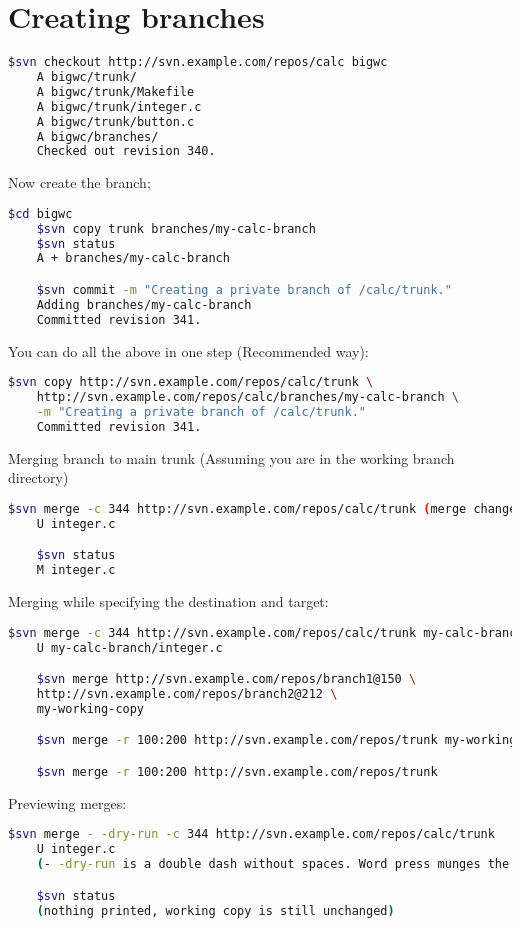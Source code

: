 \documentclass{article}
\begin{document}
\section{Creating branches}
\begin{lstlisting}[language=BASH]
    $svn checkout http://svn.example.com/repos/calc bigwc
    A bigwc/trunk/
    A bigwc/trunk/Makefile
    A bigwc/trunk/integer.c
    A bigwc/trunk/button.c
    A bigwc/branches/
    Checked out revision 340. 
\end{lstlisting}
Now create the branch;
\begin{lstlisting}[language=BASH]
    $cd bigwc
    $svn copy trunk branches/my-calc-branch
    $svn status
    A + branches/my-calc-branch

    $svn commit -m "Creating a private branch of /calc/trunk."
    Adding branches/my-calc-branch
    Committed revision 341. 
\end{lstlisting}
You can do all the above in one step (Recommended way):
\begin{lstlisting}[language=BASH]
    $svn copy http://svn.example.com/repos/calc/trunk \
    http://svn.example.com/repos/calc/branches/my-calc-branch \
    -m "Creating a private branch of /calc/trunk."
    Committed revision 341.
\end{lstlisting}
Merging branch to main trunk (Assuming you are in the working branch directory)
\begin{lstlisting}[language=BASH]
    $svn merge -c 344 http://svn.example.com/repos/calc/trunk (merge change revision number 344 on your working directory branch)
    U integer.c

    $svn status
    M integer.c 
\end{lstlisting}
Merging while specifying the destination and target:
\begin{lstlisting}[language=BASH]
    $svn merge -c 344 http://svn.example.com/repos/calc/trunk my-calc-branch
    U my-calc-branch/integer.c

    $svn merge http://svn.example.com/repos/branch1@150 \
    http://svn.example.com/repos/branch2@212 \
    my-working-copy

    $svn merge -r 100:200 http://svn.example.com/repos/trunk my-working-copy

    $svn merge -r 100:200 http://svn.example.com/repos/trunk
\end{lstlisting}
Previewing merges:
\begin{lstlisting}[language=BASH]
    $svn merge - -dry-run -c 344 http://svn.example.com/repos/calc/trunk
    U integer.c
    (- -dry-run is a double dash without spaces. Word press munges the double dash into one when put together.)

    $svn status
    (nothing printed, working copy is still unchanged) 
\end{lstlisting}
\end{document}
